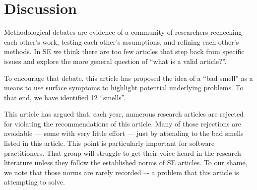 \documentclass[preprint,10pt]{elsarticle}
\begin{document}


\section{Discussion} \label{Sec:Disc}

Methodological debates are evidence of a community of researchers rechecking each other's work, testing each other's assumptions, and refining each other's methods. 
In SE we think there are too few articles that step back from specific issues and explore the more general question of ``what is a valid article?''. 

To encourage that debate, this article has proposed the idea of a ``bad smell'' as a means to use surface symptoms to highlight potential underlying problems.  To that end, we have identified 12 ``smells''.

This article has argued that, each year, numerous research articles are rejected for violating the recommendations of this article. Many of those rejections are avoidable --- some with very little effort --- just by attending to the bad smells listed in this article.  This point is particularly important
for software practitioners.  That group will struggle to get their voice heard in the research literature unless they follow the established norms of SE articles.  To our shame, we note that those norms are rarely recorded –- a problem that this article is attempting to solve.
\end{document}
